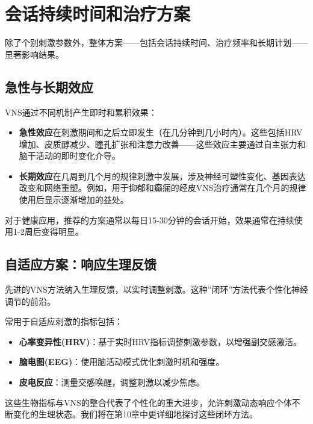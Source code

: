 \documentclass[
  Letterpaper,
]{scrbook}
\providecommand{\tightlist}{%
  \setlength{\itemsep}{0pt}\setlength{\parskip}{0pt}}\usepackage{longtable,booktabs,array}
\begin{document}
\section{会话持续时间和治疗方案}\label{ux4f1aux8bddux6301ux7eedux65f6ux95f4ux548cux6cbbux7597ux65b9ux6848}

除了个别刺激参数外，整体方案------包括会话持续时间、治疗频率和长期计划------显著影响结果。

\subsection{急性与长期效应}\label{ux6025ux6027ux4e0eux957fux671fux6548ux5e94}

VNS通过不同机制产生即时和累积效果：

\begin{itemize}
\item
  \textbf{急性效应}在刺激期间和之后立即发生（在几分钟到几小时内）。这些包括HRV增加、皮质醇减少、瞳孔扩张和注意力改善------这些效应主要通过自主张力和脑干活动的即时变化介导。
\item
  \textbf{长期效应}在几周到几个月的规律刺激中发展，涉及神经可塑性变化、基因表达改变和网络重塑。例如，用于抑郁和癫痫的经皮VNS治疗通常在几个月的规律使用后显示逐渐增加的益处。
\end{itemize}

对于健康应用，推荐的方案通常以每日15-30分钟的会话开始，效果通常在持续使用1-2周后变得明显。

\subsection{自适应方案：响应生理反馈}\label{ux81eaux9002ux5e94ux65b9ux6848ux54cdux5e94ux751fux7406ux53cdux9988}

先进的VNS方法纳入生理反馈，以实时调整刺激。这种''闭环''方法代表个性化神经调节的前沿。

常用于自适应刺激的指标包括：

\begin{itemize}
\tightlist
\item
  \textbf{心率变异性(HRV)}：基于实时HRV指标调整刺激参数，以增强副交感激活。
\item
  \textbf{脑电图(EEG)}：使用脑活动模式优化刺激时机和强度。
\item
  \textbf{皮电反应}：测量交感唤醒，调整刺激以减少焦虑。
\end{itemize}

这些生物指标与VNS的整合代表了个性化的重大进步，允许刺激动态响应个体不断变化的生理状态。我们将在第10章中更详细地探讨这些闭环方法。
\end{document}
